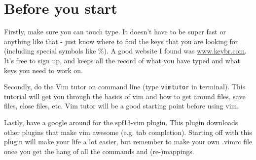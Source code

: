 \section{Before you start}

Firstly, make sure you can touch type.
It doesn't have to be super fast or anything like that - just know where to find the keys that you are looking for (including special symbols like \%).
A good website I found was \url{www.keybr.com}.
It's free to sign up, and keeps all the record of what you have typed and what keys you need to work on.

Secondly, do the Vim tutor on command line (type \verb|vimtutor| in terminal).
This tutorial will get you through the basics of vim and how to get around files, save files, close files, etc.
Vim tutor will be a good starting point before using vim.

Lastly, have a google around for the spf13-vim plugin.
This plugin downloads other plugins that make vim awesome (e.g. tab completion).
Starting off with this plugin will make your life a lot easier, but remember to make your own .vimrc file once you get the hang of all the commands and (re-)mappings.

